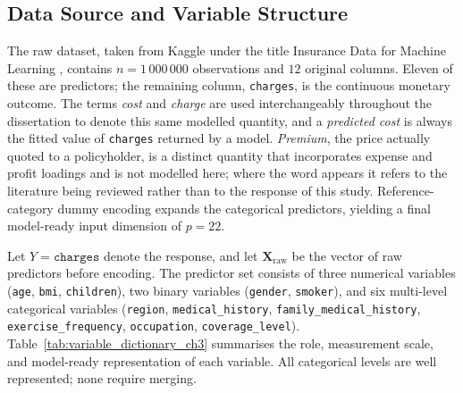 
\subsection{Data Source and Variable Structure}
\label{sec:data_source_variable_structure}

The raw dataset, taken from Kaggle under the title
Insurance Data for Machine Learning
\citep{kaggleInsuranceDataML}, contains $n = 1\,000\,000$ observations and
$12$ original columns.  Eleven of these are predictors; the remaining
column, \texttt{charges}, is the continuous monetary outcome.  The terms
\emph{cost} and \emph{charge} are used interchangeably throughout the
dissertation to denote this same modelled quantity, and a
\emph{predicted cost} is always the fitted value of \texttt{charges}
returned by a model.  \emph{Premium}, the price actually quoted to a
policyholder, is a distinct quantity that incorporates expense and profit
loadings and is not modelled here; where the word appears it refers to the
literature being reviewed rather than to the response of this study.
Reference-category dummy encoding expands the categorical predictors,
yielding a final model-ready input dimension of $p = 22$.

Let $Y = \texttt{charges}$ denote the response, and let
$\mathbf{X}_{\mathrm{raw}}$ be the vector of raw predictors before
encoding.  The predictor set consists of three numerical variables
(\texttt{age}, \texttt{bmi}, \texttt{children}), two binary variables
(\texttt{gender}, \texttt{smoker}), and six multi-level categorical
variables (\texttt{region},\allowbreak{}
\texttt{medical\_\allowbreak{}history},\allowbreak{}
\texttt{family\_medical\_\allowbreak{}history},\allowbreak{}
\texttt{exercise\_\allowbreak{}frequency},\allowbreak{}
\texttt{occupation},\allowbreak{}
\texttt{coverage\_\allowbreak{}level}).
Table~\ref{tab:variable_dictionary_ch3} summarises the role, measurement
scale, and model-ready representation of each variable.  All categorical
levels are well represented; none require merging.

